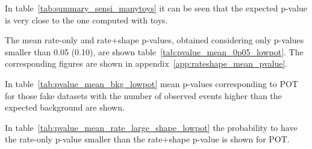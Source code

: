 In table~\ref{tab:summary_sensi_manytoys} 
it can be seen that the expected p-value is very close to the one computed with \NumToys toys.



The mean rate-only and rate+shape p-values, obtained considering only p-values smaller than 0.05 (0.10), 
are shown table~\ref{tab:pvalue_mean_0p05_lowpot}.
The corresponding figures are shown in appendix~\ref{app:rateshape_mean_pvalue}.

In table~\ref{tab:pvalue_mean_bkg_lowpot}
mean p-values corresponding to 
\TotalPot POT
for those fake datasets with the number of observed events higher than the expected background are shown. 

In table~\ref{tab:pvalue_mean_rate_large_shape_lowpot} 
the probability to have the rate-only p-value smaller than the rate+shape p-value is shown for
\TotalPot POT.

















